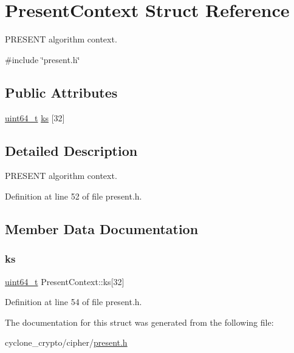 \hypertarget{structPresentContext}{}\section{Present\+Context Struct Reference}
\label{structPresentContext}


P\+R\+E\+S\+E\+NT algorithm context.  




{\ttfamily \#include \char`\"{}present.\+h\char`\"{}}

\subsection*{Public Attributes}
\begin{DoxyCompactItemize}
\item 
\hyperlink{stdint_8h_aec6fcb673ff035718c238c8c9d544c47}{uint64\+\_\+t} \hyperlink{structPresentContext_acc45bfe5b10140d7b89d0d9d94e771e6}{ks} \mbox{[}32\mbox{]}
\end{DoxyCompactItemize}


\subsection{Detailed Description}
P\+R\+E\+S\+E\+NT algorithm context. 

Definition at line 52 of file present.\+h.



\subsection{Member Data Documentation}
\mbox{\label{structPresentContext_acc45bfe5b10140d7b89d0d9d94e771e6}} 
\subsubsection{\texorpdfstring{ks}{ks}}
{\footnotesize\ttfamily \hyperlink{stdint_8h_aec6fcb673ff035718c238c8c9d544c47}{uint64\+\_\+t} Present\+Context\+::ks\mbox{[}32\mbox{]}}



Definition at line 54 of file present.\+h.



The documentation for this struct was generated from the following file\+:\begin{DoxyCompactItemize}
\item 
cyclone\+\_\+crypto/cipher/\hyperlink{present_8h}{present.\+h}\end{DoxyCompactItemize}
